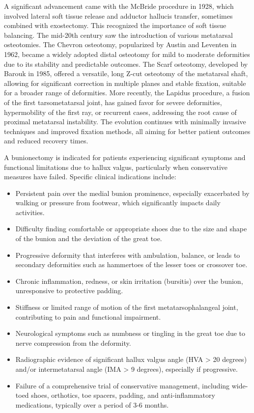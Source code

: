 A significant advancement came with the McBride procedure in 1928, which involved lateral soft tissue release and adductor hallucis transfer, sometimes combined with exostectomy. This recognized the importance of soft tissue balancing. The mid-20th century saw the introduction of various metatarsal osteotomies. The Chevron osteotomy, popularized by Austin and Leventen in 1962, became a widely adopted distal osteotomy for mild to moderate deformities due to its stability and predictable outcomes. The Scarf osteotomy, developed by Barouk in 1985, offered a versatile, long Z-cut osteotomy of the metatarsal shaft, allowing for significant correction in multiple planes and stable fixation, suitable for a broader range of deformities. More recently, the Lapidus procedure, a fusion of the first tarsometatarsal joint, has gained favor for severe deformities, hypermobility of the first ray, or recurrent cases, addressing the root cause of proximal metatarsal instability. The evolution continues with minimally invasive techniques and improved fixation methods, all aiming for better patient outcomes and reduced recovery times.

A bunionectomy is indicated for patients experiencing significant symptoms and functional limitations due to hallux valgus, particularly when conservative measures have failed. Specific clinical indications include:

\begin{itemize}
  \item Persistent pain over the medial bunion prominence, especially exacerbated by walking or pressure from footwear, which significantly impacts daily activities.
  \item Difficulty finding comfortable or appropriate shoes due to the size and shape of the bunion and the deviation of the great toe.
  \item Progressive deformity that interferes with ambulation, balance, or leads to secondary deformities such as hammertoes of the lesser toes or crossover toe.
  \item Chronic inflammation, redness, or skin irritation (bursitis) over the bunion, unresponsive to protective padding.
  \item Stiffness or limited range of motion of the first metatarsophalangeal joint, contributing to pain and functional impairment.
  \item Neurological symptoms such as numbness or tingling in the great toe due to nerve compression from the deformity.
  \item Radiographic evidence of significant hallux valgus angle (HVA > 20 degrees) and/or intermetatarsal angle (IMA > 9 degrees), especially if progressive.
  \item Failure of a comprehensive trial of conservative management, including wide-toed shoes, orthotics, toe spacers, padding, and anti-inflammatory medications, typically over a period of 3-6 months.
\end{itemize}

